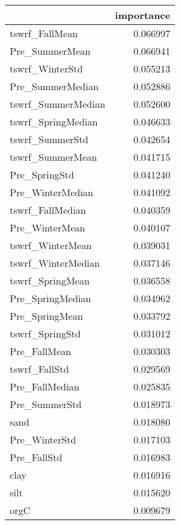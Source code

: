 \begin{tabular}{lr}
\toprule
 & importance \\
\midrule
tswrf_FallMean & 0.066997 \\
Pre_SummerMean & 0.066941 \\
tswrf_WinterStd & 0.055213 \\
Pre_SummerMedian & 0.052886 \\
tswrf_SummerMedian & 0.052600 \\
tswrf_SpringMedian & 0.046633 \\
tswrf_SummerStd & 0.042654 \\
tswrf_SummerMean & 0.041715 \\
Pre_SpringStd & 0.041240 \\
Pre_WinterMedian & 0.041092 \\
tswrf_FallMedian & 0.040359 \\
Pre_WinterMean & 0.040107 \\
tswrf_WinterMean & 0.039031 \\
tswrf_WinterMedian & 0.037146 \\
tswrf_SpringMean & 0.036558 \\
Pre_SpringMedian & 0.034962 \\
Pre_SpringMean & 0.033792 \\
tswrf_SpringStd & 0.031012 \\
Pre_FallMean & 0.030303 \\
tswrf_FallStd & 0.029569 \\
Pre_FallMedian & 0.025835 \\
Pre_SummerStd & 0.018973 \\
sand & 0.018080 \\
Pre_WinterStd & 0.017103 \\
Pre_FallStd & 0.016983 \\
clay & 0.016916 \\
silt & 0.015620 \\
orgC & 0.009679 \\
\bottomrule
\end{tabular}
